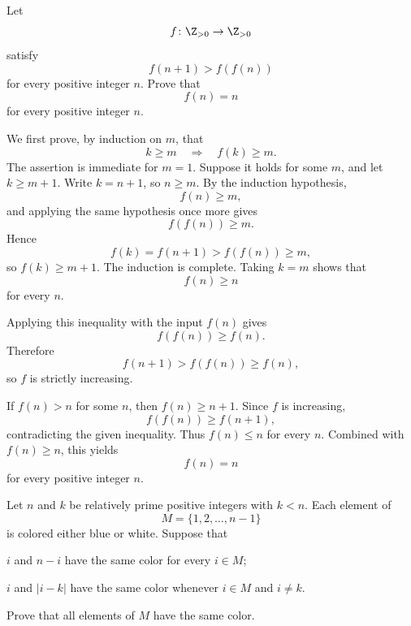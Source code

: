     \begin{expectedproblem}[1977 IMO]
        Let
        \[
            f\colon\Z_{>0}\to\Z_{>0}
        \]
        satisfy
        \[
            f(n+1)>f(f(n))
        \]
        for every positive integer $n$. Prove that
        \[
            f(n)=n
        \]
        for every positive integer $n$.
    \end{expectedproblem}

    \begin{solution}
        We first prove, by induction on $m$, that
        \[
            k\geq m
            \quad\Longrightarrow\quad
            f(k)\geq m.
        \]
        The assertion is immediate for $m=1$. Suppose it holds for some $m$,
        and let $k\geq m+1$. Write $k=n+1$, so $n\geq m$. By the induction
        hypothesis,
        \[
            f(n)\geq m,
        \]
        and applying the same hypothesis once more gives
        \[
            f(f(n))\geq m.
        \]
        Hence
        \[
            f(k)=f(n+1)>f(f(n))\geq m,
        \]
        so $f(k)\geq m+1$. The induction is complete. Taking $k=m$ shows that
        \[
            f(n)\geq n
        \]
        for every $n$.

        Applying this inequality with the input $f(n)$ gives
        \[
            f(f(n))\geq f(n).
        \]
        Therefore
        \[
            f(n+1)>f(f(n))\geq f(n),
        \]
        so $f$ is strictly increasing.

        If $f(n)>n$ for some $n$, then $f(n)\geq n+1$. Since $f$ is
        increasing,
        \[
            f(f(n))\geq f(n+1),
        \]
        contradicting the given inequality. Thus $f(n)\leq n$ for every $n$.
        Combined with $f(n)\geq n$, this yields
        \[
            \boxed{f(n)=n}
        \]
        for every positive integer $n$.
    \end{solution}

    \begin{expectedproblem}[1985 IMO]
        Let $n$ and $k$ be relatively prime positive integers with $k<n$. Each
        element of
        \[
            M=\{1,2,\ldots,n-1\}
        \]
        is colored either blue or white. Suppose that
        \begin{problemchoices}
            \item $i$ and $n-i$ have the same color for every $i\in M$;
            \item $i$ and $|i-k|$ have the same color whenever
                  $i\in M$ and $i\neq k$.
        \end{problemchoices}
        Prove that all elements of $M$ have the same color.
    \end{expectedproblem}

